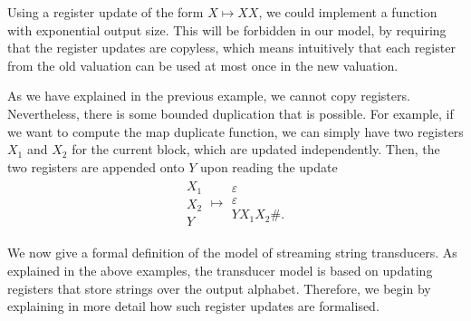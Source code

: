 \begin{myexample}
    Using a register update of the form $X \mapsto XX$, we could implement a function with exponential output size. This will be forbidden in our model, by requiring that the register updates are copyless, which means intuitively that each register from the old valuation can be used at most once in the new valuation. 
\end{myexample}

\begin{myexample}
    \label{example:map-duplicate-function-sst}
    As we have explained in the previous example, we cannot copy registers. Nevertheless, there is some bounded duplication that is possible. For example, if we want to compute the map duplicate function, we can simply have two registers $X_1$ and $X_2$ for the current block, which are updated independently. Then, the two registers are appended onto $Y$ upon reading the update
\begin{align*}
    \begin{smallmatrix}        X_1 \\
        X_2 \\ 
        Y
    \end{smallmatrix}        \mapsto 
    \begin{smallmatrix}        \varepsilon \\ 
        \varepsilon \\
        {YX_1X_2\#}.
    \end{smallmatrix}
\end{align*}
\end{myexample}

We now give a formal definition of the model of streaming string transducers. As explained in the above examples, the transducer model is based on updating registers that store strings over the output alphabet. Therefore, we begin by explaining in more detail how such register updates are formalised.

